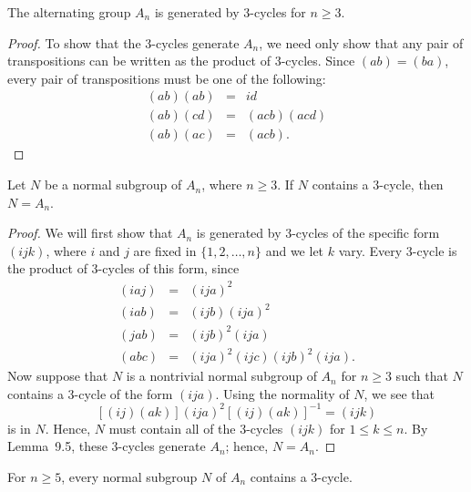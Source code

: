  
\begin{lemma}
The alternating group $A_n$ is generated by $3$-cycles for $n \geq 3$.
\end{lemma}
 
\begin{proof}
To show that the 3-cycles generate $A_n$, we need only show that any
pair of transpositions can be written as the product of 3-cycles.
Since $(a b) = (b a)$, every pair of transpositions must be one of the
following: 
\begin{eqnarray*}
(ab)(ab) & = & id \\
(ab)(cd) & = & (acb)(acd) \\
(ab)(ac) & = & (acb).
\end{eqnarray*}
\end{proof}
 
 
\begin{lemma}
Let $N$ be a  normal subgroup of $A_n$, where $n \geq 3$. If $N$ 
contains a $3$-cycle, then $N = A_n$. 
\end{lemma}
 
 
\begin{proof}
We will first show that $A_n$ is generated by 3-cycles of the specific
form $(ijk)$, where $i$ and $j$ are fixed in  $\{ 1, 2, \ldots, n \}$
and we let $k$ vary. Every 3-cycle is the product of 3-cycles of this 
form, since
\begin{eqnarray*}
(i a j) & = & (i j a)^2  \\
(i a b) & = & (i j b) (i j a)^2 \\
(j a b) & = & (i j b)^2 (i j a) \\
(a b c) & = & (i j a)^2 (i j c) (i j b)^2 (i j a).
\end{eqnarray*}
Now suppose that $N$ is a nontrivial normal subgroup of $A_n$ for $n 
\geq 3$  such that $N$ contains a 3-cycle of the form $(i j a)$. Using
the normality of $N$, we see that
$$
[(i j)(a k)](i j a)^2 [(i j)(a k)]^{-1} = (i j k)
$$
is in $N$. Hence, $N$ must contain all of the 3-cycles $(i j k)$ 
for $1 \leq k \leq n$. By Lemma~9.5, these 3-cycles generate $A_n$; 
hence, $N = A_n$. 
\end{proof}
 
 
\begin{lemma}
For $n \geq 5$, every normal subgroup $N$ of $A_n$ contains a
$3$-cycle. 
\end{lemma}
 
